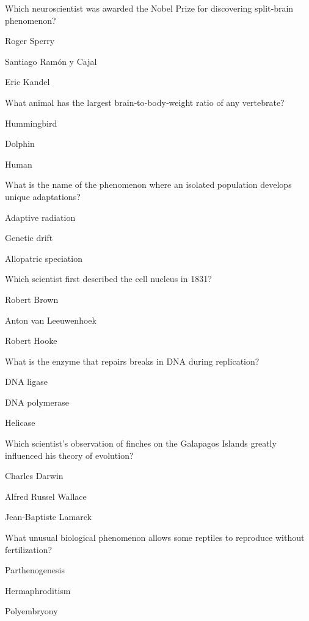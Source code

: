 \begin{enhancedmcq}{Which neuroscientist was awarded the Nobel Prize for discovering split‑brain phenomenon?}
\item Roger Sperry
\item Santiago Ramón y Cajal
\item Eric Kandel

\end{enhancedmcq}
\begin{enhancedmcq}{What animal has the largest brain‑to‑body‑weight ratio of any vertebrate?}
\item Hummingbird
\item Dolphin
\item Human

\end{enhancedmcq}
\begin{enhancedmcq}{What is the name of the phenomenon where an isolated population develops unique adaptations?}
\item Adaptive radiation
\item Genetic drift
\item Allopatric speciation

\end{enhancedmcq}
\begin{enhancedmcq}{Which scientist first described the cell nucleus in 1831?}
\item Robert Brown
\item Anton van Leeuwenhoek
\item Robert Hooke

\end{enhancedmcq}
\begin{enhancedmcq}{What is the enzyme that repairs breaks in DNA during replication?}
\item DNA ligase
\item DNA polymerase
\item Helicase

\end{enhancedmcq}
\begin{enhancedmcq}{Which scientist's observation of finches on the Galapagos Islands greatly influenced his theory of evolution?}
\item Charles Darwin
\item Alfred Russel Wallace
\item Jean‑Baptiste Lamarck

\end{enhancedmcq}
\begin{enhancedmcq}{What unusual biological phenomenon allows some reptiles to reproduce without fertilization?}
\item Parthenogenesis
\item Hermaphroditism
\item Polyembryony

\end{enhancedmcq}
